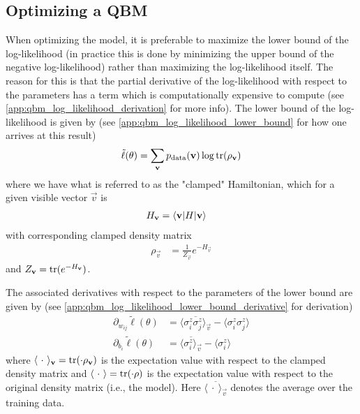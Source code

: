 \subsection{Optimizing a QBM}
When optimizing the model, it is preferable to maximize the lower bound of the log-likelihood (in practice this is done by minimizing the upper bound of the negative log-likelihood) rather than maximizing the log-likelihood itself.
The reason for this is that the partial derivative of the log-likelihood with respect to the parameters has a term which is computationally expensive to compute (see \cref{app:qbm_log_likelihood_derivation} for more info).
The lower bound of the log-likelihood is given by (see \cref{app:qbm_log_likelihood_lower_bound} for how one arrives at this result)
\begin{align}
    \tilde{\ell}(\theta) = \sum_{\mathbf{v}} p_{\text{data}}(\mathbf{v}) \log \text{tr}(\rho_{\mathbf{v}})
\end{align}
where we have what is referred to as the "clamped" Hamiltonian, which for a given visible vector \( \vec{v} \) is
\begin{align}
    H_{\mathbf{v}}
        &= \braket{\mathbf{v}|H|\mathbf{v}}
\end{align}
with corresponding clamped density matrix
\begin{align}
    \rho_\vec{v}
        &= \frac{1}{Z_\vec{v}} e^{-H_\vec{v}}
\end{align}
and \( Z_{\mathbf{v}} = \text{tr}(e^{-H_{\mathbf{v}}}) \).

The associated derivatives with respect to the parameters of the lower bound are given by (see \cref{app:qbm_log_likelihood_lower_bound_derivative} for derivation)
\begin{align}
    \partial_{w_{ij}} \tilde{\ell}(\theta)
        &= \overline{\langle \sigma_i^z \sigma_j^z \rangle_\vec{v}} - \langle \sigma_i^z \sigma_j^z \rangle \\
    \partial_{b_i} \tilde{\ell}(\theta)
        &= \overline{\langle \sigma_i^z \rangle_\vec{v}} - \langle \sigma_i^z \rangle
\end{align}
where \( \langle \ \cdot \ \rangle_{\mathbf{v}} = \text{tr}(\cdot \rho_{\mathbf{v}}) \) is the expectation value with respect to the clamped density matrix and \( \langle \ \cdot \ \rangle = \tr(\cdot \rho) \) is the expectation value with respect to the original density matrix (i.e., the model).
Here \( \overline{\langle \ \cdot \ \rangle_\vec{v}} \) denotes the average over the training data.

